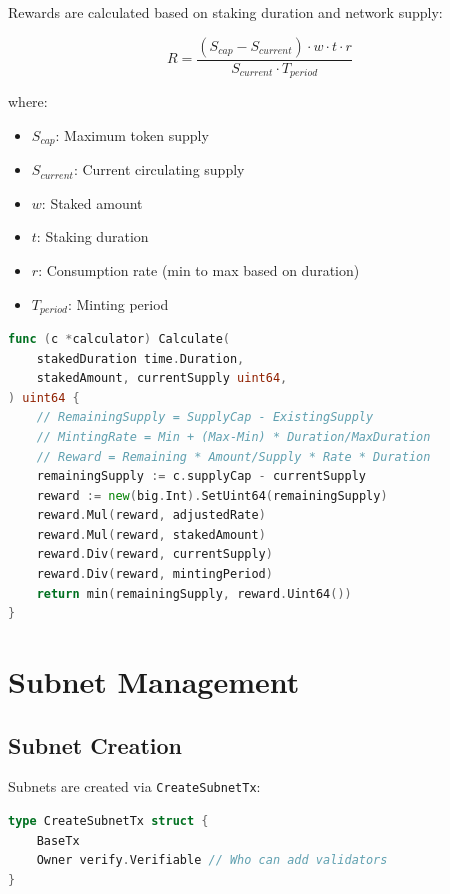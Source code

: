 \documentclass[11pt,letterpaper]{article}
\begin{document}
Rewards are calculated based on staking duration and network supply:

\begin{equation}
R = \frac{(S_{cap} - S_{current}) \cdot w \cdot t \cdot r}{S_{current} \cdot T_{period}}
\end{equation}

where:
\begin{itemize}
    \item $S_{cap}$: Maximum token supply
    \item $S_{current}$: Current circulating supply
    \item $w$: Staked amount
    \item $t$: Staking duration
    \item $r$: Consumption rate (min to max based on duration)
    \item $T_{period}$: Minting period
\end{itemize}

\begin{lstlisting}[language=Go, caption=Reward Calculator]
func (c *calculator) Calculate(
    stakedDuration time.Duration,
    stakedAmount, currentSupply uint64,
) uint64 {
    // RemainingSupply = SupplyCap - ExistingSupply
    // MintingRate = Min + (Max-Min) * Duration/MaxDuration
    // Reward = Remaining * Amount/Supply * Rate * Duration
    remainingSupply := c.supplyCap - currentSupply
    reward := new(big.Int).SetUint64(remainingSupply)
    reward.Mul(reward, adjustedRate)
    reward.Mul(reward, stakedAmount)
    reward.Div(reward, currentSupply)
    reward.Div(reward, mintingPeriod)
    return min(remainingSupply, reward.Uint64())
}
\end{lstlisting}

\section{Subnet Management}

\subsection{Subnet Creation}

Subnets are created via \texttt{CreateSubnetTx}:

\begin{lstlisting}[language=Go, caption=Subnet Creation Transaction]
type CreateSubnetTx struct {
    BaseTx
    Owner verify.Verifiable // Who can add validators
}
\end{lstlisting}
\end{document}
